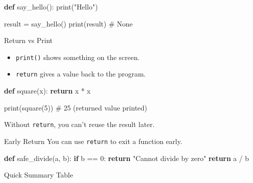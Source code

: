 \documentclass[
  letterpaper,
  DIV=11,
  numbers=noendperiod]{scrreprt}
\newenvironment{Shaded}{\begin{snugshade}}{\end{snugshade}}
\newcommand{\BuiltInTok}[1]{\textcolor[rgb]{0.00,0.23,0.31}{#1}}
\newcommand{\CommentTok}[1]{\textcolor[rgb]{0.37,0.37,0.37}{#1}}
\newcommand{\ControlFlowTok}[1]{\textcolor[rgb]{0.00,0.23,0.31}{\textbf{#1}}}
\newcommand{\DecValTok}[1]{\textcolor[rgb]{0.68,0.00,0.00}{#1}}
\newcommand{\KeywordTok}[1]{\textcolor[rgb]{0.00,0.23,0.31}{\textbf{#1}}}
\newcommand{\NormalTok}[1]{\textcolor[rgb]{0.00,0.23,0.31}{#1}}
\newcommand{\OperatorTok}[1]{\textcolor[rgb]{0.37,0.37,0.37}{#1}}
\newcommand{\StringTok}[1]{\textcolor[rgb]{0.13,0.47,0.30}{#1}}
\providecommand{\tightlist}{%
  \setlength{\itemsep}{0pt}\setlength{\parskip}{0pt}}
\begin{document}
\begin{Shaded}
\begin{Highlighting}[]
\KeywordTok{def}\NormalTok{ say\_hello():}
    \BuiltInTok{print}\NormalTok{(}\StringTok{"Hello"}\NormalTok{)}

\NormalTok{result }\OperatorTok{=}\NormalTok{ say\_hello()}
\BuiltInTok{print}\NormalTok{(result)   }\CommentTok{\# None}
\end{Highlighting}
\end{Shaded}

Return vs Print

\begin{itemize}
\tightlist
\item
  \texttt{print()} shows something on the screen.
\item
  \texttt{return} gives a value back to the program.
\end{itemize}

\begin{Shaded}
\begin{Highlighting}[]
\KeywordTok{def}\NormalTok{ square(x):}
    \ControlFlowTok{return}\NormalTok{ x }\OperatorTok{*}\NormalTok{ x}

\BuiltInTok{print}\NormalTok{(square(}\DecValTok{5}\NormalTok{))   }\CommentTok{\# 25 (returned value printed)}
\end{Highlighting}
\end{Shaded}

Without \texttt{return}, you can't reuse the result later.

Early Return You can use \texttt{return} to exit a function early.

\begin{Shaded}
\begin{Highlighting}[]
\KeywordTok{def}\NormalTok{ safe\_divide(a, b):}
    \ControlFlowTok{if}\NormalTok{ b }\OperatorTok{==} \DecValTok{0}\NormalTok{:}
        \ControlFlowTok{return} \StringTok{"Cannot divide by zero"}
    \ControlFlowTok{return}\NormalTok{ a }\OperatorTok{/}\NormalTok{ b}
\end{Highlighting}
\end{Shaded}

Quick Summary Table
\end{document}
